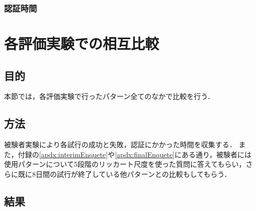 \subsubsection{認証時間}



\section{各評価実験での相互比較}\label{sec:vsAll}
\subsection{目的}
本節では，各評価実験で行ったパターン全てのなかで比較を行う．

\subsection{方法}
被験者実験により各試行の成功と失敗，認証にかかった時間を収集する．
また，付録の\ref{apdx:interimEnquete}や\ref{apdx:finalEnquete}にある通り，被験者には使用パターンについて5段階のリッカート尺度を使った質問に答えてもらい，さらに既に8日間の試行が終了している他パターンとの比較もしてもらう．

\subsection{結果}


\newpage

